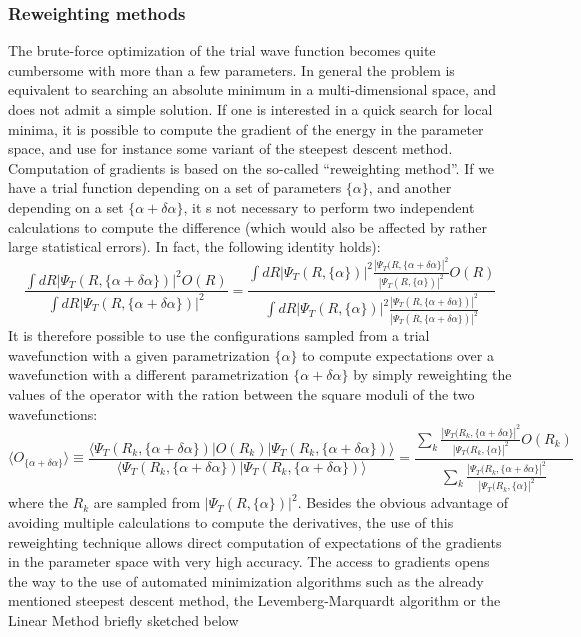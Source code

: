 \subsubsection{Reweighting methods}
The brute-force optimization of the trial wave function becomes quite cumbersome with more than a few parameters. In general the problem is equivalent to searching an absolute minimum in a multi-dimensional space, and does not admit a simple solution.
If one is interested in a quick search for local minima, it is possible to compute the gradient of the energy in the parameter space, and use for instance some variant of the steepest descent method. Computation of gradients is based on the so-called ``reweighting method''. If we have a trial function depending on a set of parameters $\{\alpha\}$, and another depending on a set $\{\alpha+\delta\alpha\}$, it s not necessary to perform two independent calculations to compute the difference (which would also be affected by rather large statistical errors). In fact, the following identity holds):
\begin{equation}
\frac{\int dR |\Psi_T(R,\{\alpha+\delta\alpha\})|^2 O(R)}{\int dR |\Psi_T(R,\{\alpha+\delta\alpha\})|^2}=
\frac{\int dR |\Psi_T(R,\{\alpha\})|^2 \frac{|\Psi_T(R,\{\alpha+\delta\alpha\}|^2}{|\Psi_T(R,\{\alpha\})|^2}O(R)}{\int dR |\Psi_T(R,\{\alpha\})|^2\frac{|\Psi_T(R,\{\alpha+\delta\alpha\})|^2}{|\Psi_T(R,\{\alpha+\delta\alpha\})|^2}}
\end{equation}
It is therefore possible to use the configurations sampled from a trial wavefunction with a given parametrization $\{\alpha\}$ to compute expectations over a wavefunction with a different parametrization $\{\alpha+\delta\alpha\}$ by simply reweighting the values of the operator with the ration between the square moduli of the two wavefunctions:
\begin{equation}
\langle O_{\{\alpha+\delta\alpha\}}\rangle\equiv
\frac{\langle \Psi_T(R_k,\{\alpha+\delta\alpha\})|O(R_k)|\Psi_T(R_k,\{\alpha+\delta\alpha\})\rangle}{\langle \Psi_T(R_k,\{\alpha+\delta\alpha\})|\Psi_T(R_k,\{\alpha+\delta\alpha\})\rangle}=
\frac{\sum_k \frac{|\Psi_T(R_k,\{\alpha+\delta\alpha\}|^2}{|\Psi_T(R_k,\{\alpha\}|^2}O(R_k)}{\sum_k \frac{|\Psi_T(R_k,\{\alpha+\delta\alpha\}|^2}{|\Psi_T(R_k,\{\alpha\}|^2}}
\end{equation}
where the $R_k$ are sampled from $|\Psi_T(R,\{\alpha\})|^2$. Besides the obvious advantage of avoiding multiple calculations to compute the derivatives, the use of this reweighting technique allows direct computation of expectations of the gradients in the parameter space with very high accuracy. The access to gradients opens the way to the use of automated minimization algorithms such as the already mentioned steepest descent method, the Levemberg-Marquardt algorithm \cite{Cyrus96} or the Linear Method \cite{Toulouse07} briefly sketched below 

